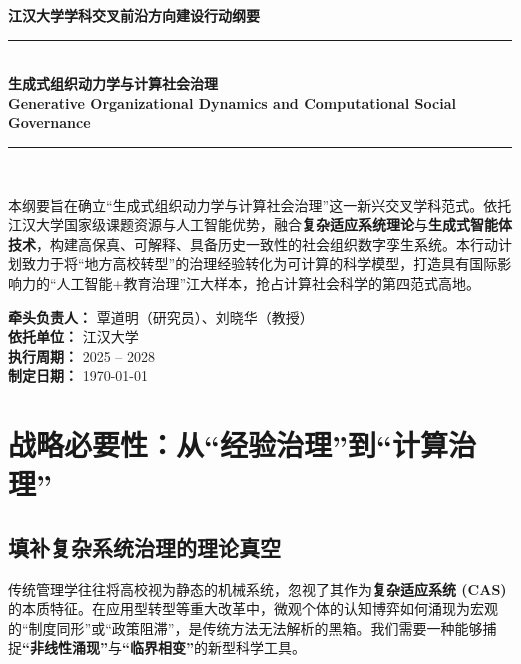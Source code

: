 \documentclass[12pt,a4paper,fontset=mac]{ctexart}
\begin{document}
\begin{titlepage}
    \centering
    \vspace*{1.5cm}
    {\Large \textbf{江汉大学学科交叉前沿方向建设行动纲要}}\\[0.8cm]
    \rule{0.8\textwidth}{2pt}\\[0.5cm]
    {\huge \bfseries 生成式组织动力学与计算社会治理}\\[0.3cm]
    {\large \textbf{Generative Organizational Dynamics and Computational Social Governance}}\\[0.5cm]
    \rule{0.8\textwidth}{2pt}\\[2cm]
    
    \begin{tcolorbox}[colback=gray!5,colframe=black,width=0.95\textwidth,arc=2mm,boxrule=1pt, title=\textbf{战略愿景}]
        \vspace{0.2cm}
        \parbox{0.95\textwidth}{\small
        \onehalfspacing
        本纲要旨在确立“生成式组织动力学与计算社会治理”这一新兴交叉学科范式。依托江汉大学国家级课题资源与人工智能优势，融合\textbf{复杂适应系统理论}与\textbf{生成式智能体技术}，构建高保真、可解释、具备历史一致性的社会组织数字孪生系统。本行动计划致力于将“地方高校转型”的治理经验转化为可计算的科学模型，打造具有国际影响力的“人工智能+教育治理”江大样本，抢占计算社会科学的第四范式高地。}
    \end{tcolorbox}
    \vspace{3.5cm}
    \textbf{牵头负责人：} 覃道明（研究员）、刘晓华（教授）\\
    \textbf{依托单位：} 江汉大学\\
    \textbf{执行周期：} 2025 -- 2028\\
    \textbf{制定日期：} \today
\end{titlepage}


\section{战略必要性：从“经验治理”到“计算治理”}

\subsection{填补复杂系统治理的理论真空}
传统管理学往往将高校视为静态的机械系统，忽视了其作为\textbf{复杂适应系统 (CAS)} 的本质特征\cite{holland1995hidden, miller2007complex}。在应用型转型等重大改革中，微观个体的认知博弈如何涌现为宏观的“制度同形”或“政策阻滞”\cite{dimaggio1983iron}，是传统方法无法解析的黑箱。我们需要一种能够捕捉\textbf{“非线性涌现”}与\textbf{“临界相变”}的新型科学工具。
\end{document}
